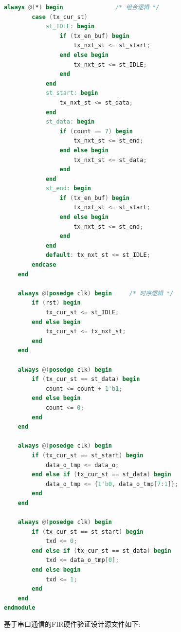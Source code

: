 \documentclass{article}
\begin{document}
\begin{lstlisting}[language=Verilog, caption={16倍过采样UART模块}]
    always @(*) begin               /* 组合逻辑 */
        case (tx_cur_st)
            st_IDLE: begin
                if (tx_en_buf) begin
                    tx_nxt_st <= st_start;
                end else begin
                    tx_nxt_st <= st_IDLE;
                end
            end
            st_start: begin
                tx_nxt_st <= st_data;
            end
            st_data: begin
                if (count == 7) begin
                    tx_nxt_st <= st_end;
                end else begin
                    tx_nxt_st <= st_data;
                end
            end
            st_end: begin
                if (tx_en_buf) begin
                    tx_nxt_st <= st_start;
                end else begin
                    tx_nxt_st <= st_end;
                end
            end
            default: tx_nxt_st <= st_IDLE;
        endcase
    end

    always @(posedge clk) begin     /* 时序逻辑 */
        if (rst) begin
            tx_cur_st <= st_IDLE;
        end else begin
            tx_cur_st <= tx_nxt_st;
        end
    end
    
    always @(posedge clk) begin
        if (tx_cur_st == st_data) begin
            count <= count + 1'b1;
        end else begin
            count <= 0;
        end
    end

    always @(posedge clk) begin
        if (tx_cur_st == st_start) begin
            data_o_tmp <= data_o;
        end else if (tx_cur_st == st_data) begin
            data_o_tmp <= {1'b0, data_o_tmp[7:1]};
        end
    end

    always @(posedge clk) begin
        if (tx_cur_st == st_start) begin
            txd <= 0;
        end else if (tx_cur_st == st_data) begin
            txd <= data_o_tmp[0];
        end else begin
            txd <= 1;
        end
    end
endmodule
\end{lstlisting}
基于串口通信的FIR硬件验证设计源文件如下:
\end{document}
